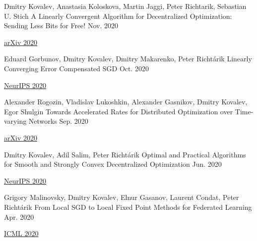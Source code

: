 
\begin{cventries}
	
	
\cventry
{Dmitry Kovalev, Anastasia Koloskova, Martin Jaggi, Peter Richtarik, Sebastian U. Stich} %
{A Linearly Convergent Algorithm for Decentralized Optimization: Sending Less Bits for Free!} %
{} %
{Nov. 2020} %
{ %
	\begin{cvitems}
		\item {\href{https://arxiv.org/abs/2011.01697}{arXiv 2020}}		
	\end{cvitems}
}	
	
\cventry
{Eduard Gorbunov, Dmitry Kovalev, Dmitry Makarenko, Peter Richtárik} %
{Linearly Converging Error Compensated SGD} %
{} %
{Oct. 2020} %
{ %
	\begin{cvitems}
		\item {\href{https://papers.nips.cc/paper/2020/hash/ef9280fbc5317f17d480e4d4f61b3751-Abstract.html}{NeurIPS 2020}}		
	\end{cvitems}
}	

\cventry
{Alexander Rogozin, Vladislav Lukoshkin, Alexander Gasnikov, Dmitry Kovalev, Egor Shulgin} %
{Towards Accelerated Rates for Distributed Optimization over Time-varying Networks} %
{} %
{Sep. 2020} %
{ %
	\begin{cvitems}
		\item {\href{https://arxiv.org/abs/2009.11069}{arXiv 2020}}		
	\end{cvitems}
}	

\cventry
{Dmitry Kovalev, Adil Salim, Peter Richtárik} %
{Optimal and Practical Algorithms for Smooth and Strongly Convex Decentralized Optimization} %
{} %
{Jun. 2020} %
{ %
	\begin{cvitems}
		\item {\href{https://papers.nips.cc/paper/2020/hash/d530d454337fb09964237fecb4bea6ce-Abstract.html}{NeurIPS 2020}}		
	\end{cvitems}
}	
	
	
\cventry
{Grigory Malinovsky, Dmitry Kovalev, Elnur Gasanov, Laurent Condat, Peter Richtárik} %
{From Local SGD to Local Fixed Point Methods for Federated Learning} %
{} %
{Apr. 2020} %
{ %
	\begin{cvitems}
		\item {\href{https://proceedings.icml.cc/paper/2020/hash/53fdae58e861476b182b0cd6beade809-Abstract.html}{ICML 2020}}		
	\end{cvitems}
}	
	

\end{cventries}
